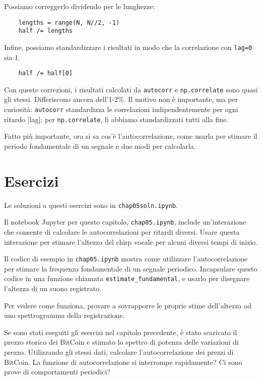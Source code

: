 \documentclass[12pt]{book} \usepackage[width=5.5in,height=8.5in, hmarginratio=3:2,vmarginratio=1:1]{geometry}
\begin{document}
Possiamo correggerlo dividendo per le lunghezze:

\begin{verbatim} 
    lengths = range(N, N//2, -1)
    half /= lengths
 \end{verbatim} 

Infine, possiamo standardizzare i risultati in modo che la correlazione con {\tt lag=0} sia 1.

\begin{verbatim} 
    half /= half[0]
 \end{verbatim} 

Con queste correzioni, i risultati calcolati da {\tt autocorr} e {\tt np.correlate} sono quasi gli stessi. Differiscono ancora dell'1-2\%. Il motivo non è importante, ma per curiosità: {\tt autocorr} standardizza le correlazioni indipendentemente per ogni ritardo [lag]; per {\tt np.correlate}, li abbiamo standardizzati tutti alla fine.

Fatto più importante, ora si sa cos'è l'autocorrelazione, come usarla per stimare il periodo fondamentale di un segnale e due modi per calcolarla.

\section{Esercizi} 

Le soluzioni a questi esercizi sono in {\tt chap05soln.ipynb}.

\begin{exercise} Il notebook Jupyter per questo capitolo, {\tt chap05.ipynb}, include un'interazione che consente di calcolare le autocorrelazioni per ritardi diversi. Usare questa interazione per stimare l'altezza del chirp vocale per alcuni diversi tempi di inizio. \end{exercise} 

\begin{exercise} Il codice di esempio in \verb"chap05.ipynb" mostra come utilizzare l'autocorrelazione per stimare la frequenza fondamentale di un segnale periodico. Incapsulare questo codice in una funzione chiamata \verb"estimate_fundamental", e usarlo per disegnare l'altezza di un suono registrato.

Per vedere come funziona, provare a sovrapporre le proprie stime dell'altezza ad uno spettrogramma della registrazione. \end{exercise} 

\begin{exercise} Se sono stati eseguiti gli esercizi nel capitolo precedente, è stato scaricato il prezzo storico dei BitCoin e stimato lo spettro di potenza delle variazioni di prezzo. Utilizzando gli stessi dati, calcolare l'autocorrelazione dei prezzi di BitCoin. La funzione di autocorrelazione si interrompe rapidamente? Ci sono prove di comportamenti periodici? \end{exercise} 
\end{document}
